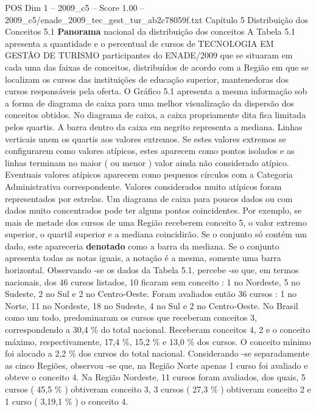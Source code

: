 \begin{textsample}{POS Dim 1 – 2009\_c5 – Score 1.00 – 2009\_c5/enade\_2009\_tec\_gest\_tur\_ab2c78059f.txt}  \label{ex:f1_pos_148}
Capítulo 5 Distribuição dos Conceitos 5.1 \textbf{Panorama} nacional da distribuição dos conceitos A Tabela 5.1 apresenta a quantidade e o percentual de cursos de TECNOLOGIA EM GESTÃO DE TURISMO participantes do ENADE/2009 que se situaram em cada uma das faixas de conceitos, distribuídos de acordo com a Região em que se localizam os cursos das instituições de educação superior, mantenedoras dos cursos responsáveis pela oferta.
O Gráfico 5.1 apresenta a mesma informação sob a forma de diagrama de caixa para uma melhor visualização da dispersão dos conceitos obtidos.
No diagrama de caixa, a caixa propriamente dita fica limitada pelos quartis.
A barra dentro da caixa em negrito representa a mediana.
Linhas verticais unem os quartis aos valores extremos.
Se estes valores extremos se configurarem como valores atípicos, estes aparecem como pontos isolados e as linhas terminam no maior ( ou menor ) valor ainda não considerado atípico.
Eventuais valores atípicos aparecem como pequenos círculos com a Categoria Administrativa correspondente.
Valores considerados muito atípicos foram representados por estrelas.
Um diagrama de caixa para poucos dados ou com dados muito concentrados pode ter alguns pontos coincidentes.
Por exemplo, se mais de metade dos cursos de uma Região receberem conceito 5, o valor extremo superior, o quartil superior e a mediana coincidirão.
Se o conjunto só contém um dado, este apareceria \textbf{denotado} como a barra da mediana.
Se o conjunto apresenta todas as notas iguais, a notação é a mesma, somente uma barra horizontal.
Observando -se os dados da Tabela 5.1, percebe -se que, em termos nacionais, dos 46 cursos listados, 10 ficaram sem conceito : 1 no Nordeste, 5 no Sudeste, 2 no Sul e 2 no Centro-Oeste.
Foram avaliados então 36 cursos : 1 no Norte, 11 no Nordeste, 18 no Sudeste, 4 no Sul e 2 no Centro-Oeste.
No Brasil como um todo, predominaram os cursos que receberam conceitos 3, correspondendo a 30,4 \% do total nacional.
Receberam conceitos 4, 2 e o conceito máximo, respectivamente, 17,4 \%, 15,2 \% e 13,0 \% dos cursos.
O conceito mínimo foi alocado a 2,2 \% dos cursos do total nacional.
Considerando -se separadamente as cinco Regiões, observou -se que, na Região Norte apenas 1 curso foi avaliado e obteve o conceito 4.
Na Região Nordeste, 11 cursos foram avaliados, dos quais, 5 cursos ( 45,5 \% ) obtiveram conceito 3, 3 cursos ( 27,3 \% ) obtiveram conceito 2 e 1 curso ( 3,19,1 \% ) o conceito 4.

\end{textsample}
